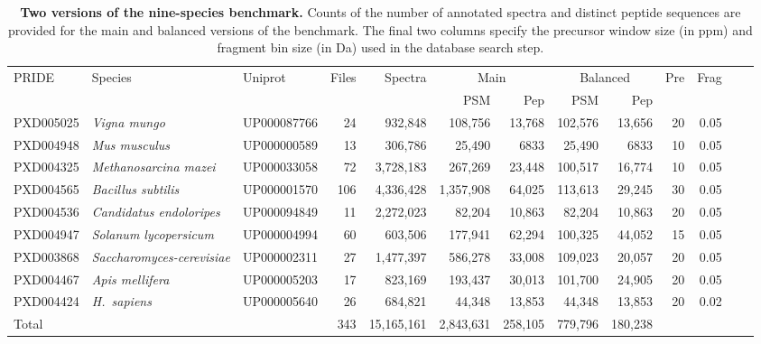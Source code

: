 \documentclass{article}
\begin{document}

\begin{table}
  \centering
  \scriptsize
\begin{tabular}{lllrrrrrrrrrr}
\hline
PRIDE & Species & Uniprot & Files & Spectra &
\multicolumn{2}{c}{Main} & \multicolumn{2}{c}{Balanced} & Pre & Frag \\
& & & & & PSM & Pep  & PSM & Pep  \\
\hline
PXD005025 & \textit{Vigna mungo} & UP000087766 & 24 & 932,848 &
108,756 & 13,768 & 102,576 & 13,656 & 20 & 0.05 \\
PXD004948 & \textit{Mus musculus} & UP000000589 & 13 & 306,786 & 
25,490 & 6833 & 25,490 & 6833 & 10 & 0.05 \\
PXD004325 & \textit{Methanosarcina mazei} & UP000033058  & 72 & 3,728,183 &
267,269 & 23,448 & 100,517 & 16,774 & 10 & 0.05 \\
 PXD004565 & \textit{Bacillus subtilis} & UP000001570 & 106 & 4,336,428 &
1,357,908 & 64,025 & 113,613 & 29,245 & 30 & 0.05 \\
PXD004536 & \textit{Candidatus endoloripes} & UP000094849 & 11 & 2,272,023 &
82,204 & 10,863 & 82,204 & 10,863 & 20 & 0.05 \\
PXD004947 & \textit{Solanum lycopersicum} & UP000004994 & 60 & 603,506 &
177,941 & 62,294 & 100,325 & 44,052 & 15 & 0.05 \\
PXD003868 & \textit{Saccharomyces-cerevisiae} & UP000002311 & 27 & 1,477,397 &
586,278 & 33,008 & 109,023 & 20,057 & 20 & 0.05 \\
PXD004467 & \textit{Apis mellifera} & UP000005203 & 17 & 823,169 &
193,437 & 30,013 & 101,700 & 24,905 & 20 & 0.05 \\
PXD004424 & \textit{H.\ sapiens} & UP000005640 & 26 & 684,821 &
44,348 & 13,853 & 44,348 & 13,853 & 20 & 0.02 \\
\hline
Total & & & 343 & 15,165,161  & 2,843,631 & 258,105 & 779,796 & 180,238  \\
\end{tabular}
\caption{{\bf Two versions of the nine-species benchmark.}
  Counts of the number of annotated spectra and distinct peptide sequences are provided for the main and balanced versions of the benchmark.
The final two columns specify the precursor window size (in ppm) and fragment bin size (in Da) used in the database search step.
}
\label{tab:benchmark}
\end{table}
\end{document}
